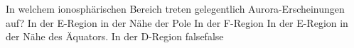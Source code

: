     {In welchem ionosphärischen Bereich treten gelegentlich Aurora-Erscheinungen auf?}
    {In der E-Region in der Nähe der Pole}
    {In der F-Region}
    {In der E-Region in der Nähe des Äquators.}
    {In der D-Region}
    {false}{false}